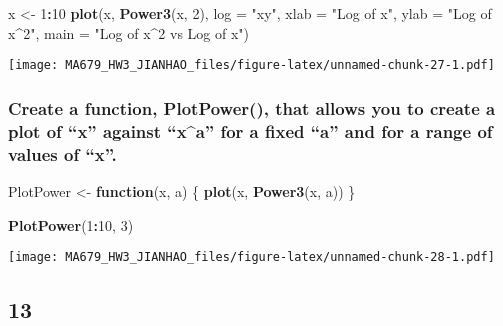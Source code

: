 \documentclass[]{article}
\newenvironment{Shaded}{\begin{snugshade}}{\end{snugshade}}
\newcommand{\KeywordTok}[1]{\textcolor[rgb]{0.13,0.29,0.53}{\textbf{#1}}}
\newcommand{\DataTypeTok}[1]{\textcolor[rgb]{0.13,0.29,0.53}{#1}}
\newcommand{\DecValTok}[1]{\textcolor[rgb]{0.00,0.00,0.81}{#1}}
\newcommand{\StringTok}[1]{\textcolor[rgb]{0.31,0.60,0.02}{#1}}
\newcommand{\ControlFlowTok}[1]{\textcolor[rgb]{0.13,0.29,0.53}{\textbf{#1}}}
\newcommand{\OperatorTok}[1]{\textcolor[rgb]{0.81,0.36,0.00}{\textbf{#1}}}
\newcommand{\NormalTok}[1]{#1}
\begin{document}
\begin{Shaded}
\begin{Highlighting}[]
\NormalTok{x <-}\StringTok{ }\DecValTok{1}\OperatorTok{:}\DecValTok{10}
\KeywordTok{plot}\NormalTok{(x, }\KeywordTok{Power3}\NormalTok{(x, }\DecValTok{2}\NormalTok{), }\DataTypeTok{log =} \StringTok{"xy"}\NormalTok{, }\DataTypeTok{xlab =} \StringTok{"Log of x"}\NormalTok{, }\DataTypeTok{ylab =} \StringTok{"Log of x^2"}\NormalTok{, }\DataTypeTok{main =} \StringTok{"Log of x^2 vs Log of x"}\NormalTok{)}
\end{Highlighting}
\end{Shaded}

\texttt{[image: MA679\_HW3\_JIANHAO\_files/figure-latex/unnamed-chunk-27-1.pdf]}

\subsubsection{\texorpdfstring{Create a function, PlotPower(), that
allows you to create a plot of ``x'' against ``x\^{}a'' for a fixed
``a'' and for a range of values of
``x''.}{Create a function, PlotPower(), that allows you to create a plot of x against x\^{}a for a fixed a and for a range of values of x.}}\label{create-a-function-plotpower-that-allows-you-to-create-a-plot-of-x-against-xa-for-a-fixed-a-and-for-a-range-of-values-of-x.}

\begin{Shaded}
\begin{Highlighting}[]
\NormalTok{PlotPower <-}\StringTok{ }\ControlFlowTok{function}\NormalTok{(x, a) \{}
    \KeywordTok{plot}\NormalTok{(x, }\KeywordTok{Power3}\NormalTok{(x, a))}
\NormalTok{\}}

\KeywordTok{PlotPower}\NormalTok{(}\DecValTok{1}\OperatorTok{:}\DecValTok{10}\NormalTok{, }\DecValTok{3}\NormalTok{)}
\end{Highlighting}
\end{Shaded}

\texttt{[image: MA679\_HW3\_JIANHAO\_files/figure-latex/unnamed-chunk-28-1.pdf]}

\subsection{13}\label{section-2}
\end{document}
